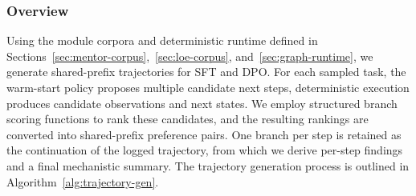 \documentclass[thesis,letterpaper,12pt]{utthesis}
\begin{document}
\subsubsection{Overview}
Using the module corpora and deterministic runtime defined in Sections~\ref{sec:mentor-corpus},~\ref{sec:loe-corpus}, and~\ref{sec:graph-runtime}, we generate shared-prefix trajectories for SFT and DPO. For each sampled task, the warm-start policy proposes multiple candidate next steps, deterministic execution produces candidate observations and next states. We employ structured branch scoring functions to rank these candidates, and the resulting rankings are converted into shared-prefix preference pairs. One branch per step is retained as the continuation of the logged trajectory, from which we derive per-step findings and a final mechanistic summary. The trajectory generation process is outlined in Algorithm~\ref{alg:trajectory-gen}.
\end{document}
